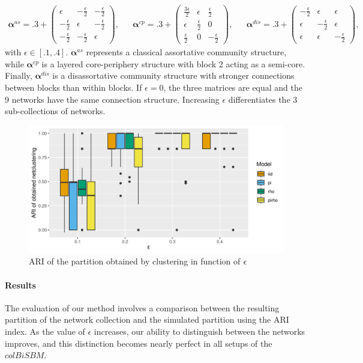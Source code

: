 \begin{align*}
\bm{\alpha}^{as} = .3 + \begin{pmatrix}
    \epsilon & - \frac{\epsilon}{2} & - \frac{\epsilon}{2}\\
    - \frac{\epsilon}{2} & \epsilon & - \frac{\epsilon}{2}\\
    - \frac{\epsilon}{2} & - \frac{\epsilon}{2} & \epsilon
\end{pmatrix}, &&
\bm{\alpha}^{cp} = .3 + \begin{pmatrix}
    \frac{3 \epsilon}{2} & \epsilon & \frac{\epsilon}{2}\\
    \epsilon & \frac{\epsilon}{2} & 0\\
    \frac{\epsilon}{2} & 0 & - \frac{\epsilon}{2}
\end{pmatrix}, &&
\bm{\alpha}^{dis} = .3 + \begin{pmatrix}
    - \frac{\epsilon}{2} & \epsilon & \epsilon\\
    \epsilon & - \frac{\epsilon}{2} & \epsilon\\
    \epsilon & \epsilon & - \frac{\epsilon}{2}
\end{pmatrix},
\end{align*} with \(\epsilon \in [.1, .4]\). \(\bm{\alpha}^{as}\)
represents a classical assortative community structure, while
\(\bm{\alpha}^{cp}\) is a layered core-periphery structure with block 2
acting as a semi-core. Finally, \(\bm{\alpha}^{dis}\) is a
disassortative community structure with stronger connections between
blocks than within blocks. If \(\epsilon = 0\), the three matrices are
equal and the 9 networks have the same connection structure. Increasing
\(\epsilon\) differentiates the 3 sub-collections of networks.

\begin{figure}
\centering
\includegraphics{./img/ca0adc96e26b9b41eb8dec4c472696309ebcf0fe.png}
\caption{\label{}ARI of the partition obtained by clustering in function
of \(\epsilon_{}\)}
\end{figure}

\paragraph{Results}

The evaluation of our method involves a comparison between the resulting
partition of the network collection and the simulated partition using
the ARI index. As the value of \(\epsilon\) increases, our ability to
distinguish between the networks improves, and this distinction becomes
nearly perfect in all setups of the \(colBiSBM\).
